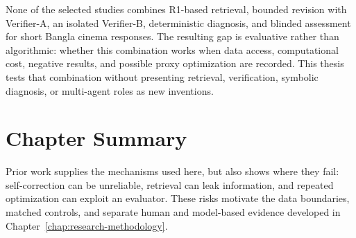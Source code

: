 None of the selected studies combines R1-based retrieval, bounded revision with Verifier-A, an isolated Verifier-B, deterministic diagnosis, and blinded assessment for short Bangla cinema responses. The resulting gap is evaluative rather than algorithmic: whether this combination works when data access, computational cost, negative results, and possible proxy optimization are recorded. This thesis tests that combination without presenting retrieval, verification, symbolic diagnosis, or multi-agent roles as new inventions.

\section{Chapter Summary}
\label{sec:related-work-summary}

Prior work supplies the mechanisms used here, but also shows where they fail: self-correction can be unreliable, retrieval can leak information, and repeated optimization can exploit an evaluator. These risks motivate the data boundaries, matched controls, and separate human and model-based evidence developed in Chapter~\ref{chap:research-methodology}.
